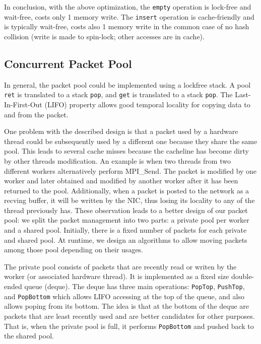 \documentclass{sig-alternate-05-2015}
\begin{document}
In conclusion, with the above optimization, the \texttt{empty} operation is
lock-free and wait-free, costs only 1 memory write. The \texttt{insert}
operation is cache-friendly and is typically wait-free, costs also 1 memory
write in the common case of no hash collision (write is made to spin-lock;
other accesses are in cache).

\subsection{Concurrent Packet Pool}
In general, the packet pool could be implemented using a lockfree stack. A pool
\texttt{ret} is translated to a stack \texttt{pop}, and \texttt{get} is
translated to a stack \texttt{pop}.  The Last-In-First-Out (LIFO) property
allows good temporal locality for copying data to and from the packet.

One problem with the described design is that a packet used by a hardware
thread could be subsequently used by a different one because they share the
same pool. This leads to several cache misses because the cacheline has become
dirty by other threads modification. An example is when two threads from two
different workers alternatively perform MPI_Send. The packet is modified by one
worker and later obtained and modified by another worker after it has been
returned to the pool. Additionally, when a packet is posted to the network as
a recving buffer, it will be written by the NIC, thus losing its locality to
any of the thread previously has. These observation leads to a better design
of our packet pool: we split the packet management into two parts: a private
pool per worker and a shared pool. Initially, there is a fixed number of 
packets for each private and shared pool. At runtime, we design an algorithms to 
allow moving packets among those pool depending on their usages.

The private pool consists of packets that are recently read or writen by the
worker (or associated hardware thread). It is implemented as a fixed size
double-ended queue (deque). The deque has three main operations:
\texttt{PopTop}, \texttt{PushTop}, and \texttt{PopBottom} which allows LIFO
accessing at the top of the queue, and also allows poping from its bottom. The
idea is that at the bottom of the deque are packets that are least recently
used and are better candidates for other purposes. That is, when the private
pool is full, it performs \texttt{PopBottom} and pushed back to
the shared pool.
\end{document}
